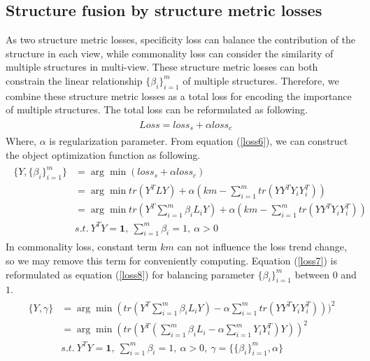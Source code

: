 \documentclass[review]{elsarticle}
\begin{document}
\subsection{Structure fusion by structure metric losses}
\label{SF}
As two structure metric losses, specificity loss can balance the contribution of the structure in each view, while commonality loss can consider the similarity of multiple structures in multi-view. These structure metric losses can both constrain the linear relationship $\{\beta_{i}\}_{i=1}^{m}$ of multiple structures. Therefore, we combine these structure metric losses as a total loss for encoding the importance of multiple structures. The total loss can be reformulated as following.
\begin{align}
\label{loss6}
\begin{aligned}
&Loss=loss_{s}+\alpha loss_{c}
\end{aligned}
\end{align}
Where, $\alpha$ is regularization parameter.  From equation (\ref{loss6}), we can construct the object optimization function as following.
\begin{align}
\label{loss7}
\begin{aligned}
\{Y,\{\beta_{i}\}_{i=1}^{m}\}&=\arg \min (loss_{s}+\alpha loss_{c})\\
&=\arg \min tr(Y^{T}LY)+\alpha(km-\sum_{i=1}^{m}tr(YY^{T}Y_{i}Y_{i}^{T}))\\
&=\arg \min tr(Y^{T}\sum_{i=1}^{m}\beta_{i}L_{i}Y)+\alpha(km-\sum_{i=1}^{m}tr(YY^{T}Y_{i}Y_{i}^{T}))\\
&s.t.\ Y^{T}Y=\mathbf{1}, \ \sum_{i=1}^{m}\beta_{i}=1,\ \alpha >0
\end{aligned}
\end{align}
In commonality loss, constant term $km$ can not influence the loss trend change, so we may remove this term for conveniently computing. Equation (\ref{loss7}) is reformulated as equation (\ref{loss8}) for balancing parameter $\{\beta_{i}\}_{i=1}^{m}$ between $0$ and $1$.
\begin{align}
\label{loss8}
\begin{aligned}
\{Y,\gamma\}&=\arg \min (tr(Y^{T}\sum_{i=1}^{m}\beta_{i}L_{i}Y)-\alpha\sum_{i=1}^{m}tr(YY^{T}Y_{i}Y_{i}^{T})))^2\\
&=\arg \min (tr(Y^{T}(\sum_{i=1}^{m}\beta_{i}L_{i}-\alpha\sum_{i=1}^{m}Y_{i}Y_{i}^{T})Y))^2\\
&s.t.\ Y^{T}Y=\mathbf{1},\ \sum_{i=1}^{m}\beta_{i}=1,\ \alpha >0,\ \gamma=\{\{\beta_{i}\}_{i=1}^{m},\alpha\}
\end{aligned}
\end{align}
\end{document}
